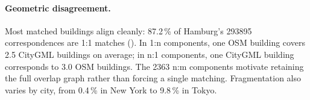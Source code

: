 \documentclass[sigconf,authordraft]{acmart}
\begin{document}

\paragraph{Geometric disagreement.} Most matched buildings align cleanly: 87.2\,\% of Hamburg's \num{293895} correspondences are 1:1 matches (). 
In 1:n components, one OSM building covers 2.5 CityGML buildings on average; in n:1 components, one CityGML building corresponds to 3.0 OSM buildings. The \num{2363} n:m components motivate retaining the full overlap graph rather than forcing a single matching. Fragmentation also varies by city, from 0.4\,\% in New York to 
9.8\,\% in Tokyo.
\end{document}
